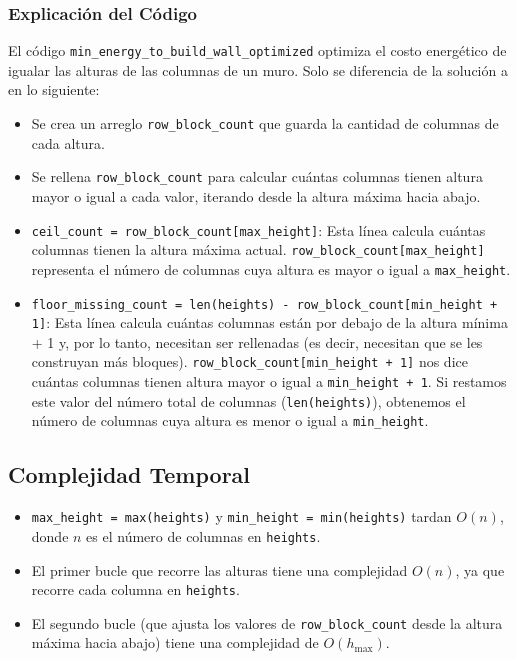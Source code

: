 \documentclass[a4paper,12pt]{article}
\begin{document}
\subsubsection{Explicación del Código}

El código \texttt{min\_energy\_to\_build\_wall\_optimized} optimiza el costo energético de igualar las alturas de las columnas de un muro. Solo se diferencia de la solución a en lo siguiente:

\begin{itemize}
	\item Se crea un arreglo \texttt{row\_block\_count} que guarda la cantidad de columnas de cada altura.
	\item Se rellena \texttt{row\_block\_count} para calcular cuántas columnas tienen altura mayor o igual a cada valor, iterando desde la altura máxima hacia abajo.
	\item \texttt{ceil\_count = row\_block\_count[max\_height]}: Esta línea calcula cuántas columnas tienen la altura máxima actual. \texttt{row\_block\_count[max\_height]} representa el número de columnas cuya altura es mayor o igual a \texttt{max\_height}.
	\item \texttt{floor\_missing\_count = len(heights) - row\_block\_count[min\_height + 1]}: Esta línea calcula cuántas columnas están por debajo de la altura mínima + 1 y, por lo tanto, necesitan ser rellenadas (es decir, necesitan que se les construyan más bloques). \texttt{row\_block\_count[min\_height + 1]} nos dice cuántas columnas tienen altura mayor o igual a \texttt{min\_height + 1}. Si restamos este valor del número total de columnas (\texttt{len(heights)}), obtenemos el número de columnas cuya altura es menor o igual a \texttt{min\_height}.
\end{itemize}

\subsection{Complejidad Temporal}

\begin{itemize}
	\item \texttt{max\_height = max(heights)} y \texttt{min\_height = min(heights)} tardan \(O(n)\), donde \(n\) es el número de columnas en \texttt{heights}.
	\item El primer bucle que recorre las alturas tiene una complejidad \(O(n)\), ya que recorre cada columna en \texttt{heights}.
	\item El segundo bucle (que ajusta los valores de \texttt{row\_block\_count} desde la altura máxima hacia abajo) tiene una complejidad de \(O(h_{\text{max}})\).
\end{itemize}
\end{document}
